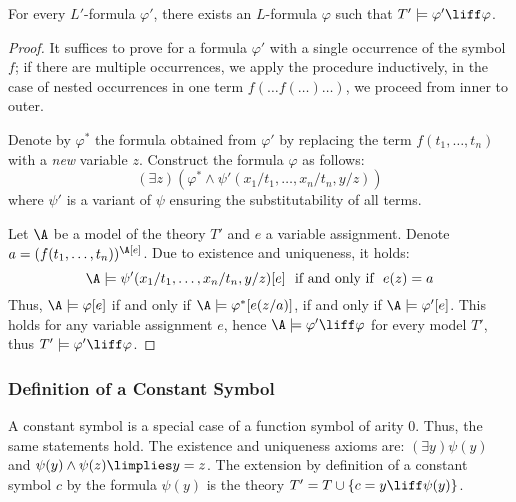 \begin{proposition}
    For every $L'$-formula $\varphi'$, there exists an $L$-formula $\varphi$ such that $T'\models\varphi'\liff\varphi$.
\end{proposition}
\begin{proof}
    It suffices to prove for a formula $\varphi'$ with a single occurrence of the symbol $f$; if there are multiple occurrences, we apply the procedure inductively, in the case of nested occurrences in one term $f(\dots f(\dots)\dots)$, we proceed from inner to outer.

    Denote by $\varphi^*$ the formula obtained from $\varphi'$ by replacing the term $f(t_1,\dots,t_n)$ with a \emph{new} variable $z$. Construct the formula $\varphi$ as follows:
    $$
    (\exists z)(\varphi^*\land \psi'(x_1/t_1,\dots,x_n/t_n,y/z))
    $$
    where $\psi'$ is a variant of $\psi$ ensuring the substitutability of all terms.

    Let $\A$ be a model of the theory $T'$ and $e$ a variable assignment. Denote $a=(f(t_1,\dots,t_n))^\A[e]$. Due to existence and uniqueness, it holds:
    $$
    \A\models\psi'(x_1/t_1,\dots,x_n/t_n,y/z)[e]\ \text{ if and only if }\ e(z)=a 
    $$
    Thus, $\A\models\varphi[e]$ if and only if $\A\models\varphi^*[e(z/a)]$, if and only if $\A\models\varphi'[e]$. This holds for any variable assignment $e$, hence $\A\models\varphi'\liff\varphi$ for every model $T'$, thus $T'\models\varphi'\liff\varphi$.
\end{proof}

\subsubsection*{Definition of a Constant Symbol}

A constant symbol is a special case of a function symbol of arity 0. Thus, the same statements hold. The existence and uniqueness axioms are: $(\exists y)\psi(y)$ and $\psi(y)\land\psi(z)\limplies y=z$. The extension by definition of a constant symbol $c$ by the formula $\psi(y)$ is the theory $T'=T\cup\{c=y\liff \psi(y)\}$.

